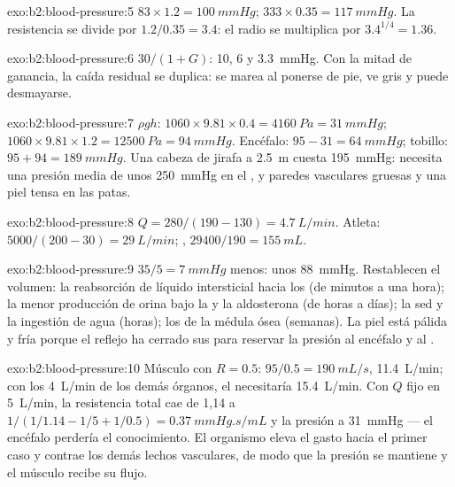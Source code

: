 \begin{solution}{exo:b2:blood-pressure:5}
$83\times 1.2 = \qty{100}{mmHg}$; $333\times 0.35 = \qty{117}{mmHg}$.
La resistencia se divide por $1.2/0.35 = 3.4$: el radio se multiplica por $3.4^{1/4} =
1.36$.
\end{solution}

\begin{solution}{exo:b2:blood-pressure:6}
$30/(1 + G)$: 10, 6 y \qty{3.3}{mmHg}. Con la mitad de ganancia, la caída
residual se duplica: se marea al ponerse de pie, ve gris y puede
desmayarse.
\end{solution}

\begin{solution}{exo:b2:blood-pressure:7}
$\rho g h$: $1060\times 9.81\times 0.4 = \qty{4160}{Pa} =
\qty{31}{mmHg}$; $1060\times 9.81\times 1.2 = \qty{12500}{Pa} =
\qty{94}{mmHg}$. Encéfalo: $95 - 31 = \qty{64}{mmHg}$; tobillo: $95 + 94 =
\qty{189}{mmHg}$. Una cabeza de jirafa a \qty{2.5}{m} cuesta
\qty{195}{mmHg}: necesita una presión media de unos \qty{250}{mmHg} en el
, y paredes vasculares gruesas y una piel tensa en las patas.
\end{solution}

\begin{solution}{exo:b2:blood-pressure:8}
$Q = 280/(190 - 130) = \qty{4.7}{L/min}$. Atleta: $5000/(200 - 30) =
\qty{29}{L/min}$; , $\num{29400}/190 = \qty{155}{mL}$.
\end{solution}

\begin{solution}{exo:b2:blood-pressure:9}
$35/5 = \qty{7}{mmHg}$ menos: unos \qty{88}{mmHg}. Restablecen el volumen:
la reabsorción de líquido intersticial hacia los  (de minutos a
una hora); la menor producción de orina bajo la  y la
aldosterona (de horas a días); la sed y la ingestión de agua (horas); los
 de la médula ósea (semanas). La piel está pálida y fría
porque el reflejo ha cerrado sus  para reservar la presión al
encéfalo y al .
\end{solution}

\begin{solution}{exo:b2:blood-pressure:10}
Músculo con $R = 0.5$: $95/0.5 = \qty{190}{mL/s}$, \qty{11.4}{L/min};
con los \qty{4}{L/min} de los demás órganos, el  necesitaría
\qty{15.4}{L/min}. Con $Q$ fijo en \qty{5}{L/min}, la resistencia total
cae de 1,14 a $1/(1/1.14 - 1/5 + 1/0.5) =
\qty{0.37}{mmHg.s/mL}$ y la presión a \qty{31}{mmHg} --- el encéfalo
perdería el conocimiento. El organismo eleva el gasto hacia el primer caso
y contrae los demás lechos vasculares, de modo que la presión se mantiene
y el músculo recibe su flujo.
\end{solution}

